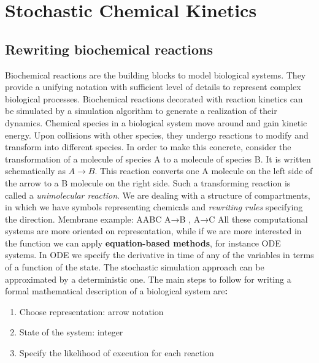 \graphicspath{{chapters/02/images/}}
\chapter{Stochastic Chemical Kinetics}

\section{Rewriting biochemical reactions}
Biochemical reactions are the building blocks to model biological systems.
They provide a unifying notation with sufficient level of details to represent complex biological processes.
Biochemical reactions decorated with reaction kinetics can be simulated by a simulation algorithm to generate a realization of their dynamics.
Chemical species in a biological system move around and gain kinetic energy.
Upon collisions with other species, they undergo reactions to modify and transform into different species.
In order to make this concrete, consider the transformation of a molecule of species A to a molecule of species B.
It is written schematically as $A \rightarrow B$.
This reaction converts one A molecule on the left side of the arrow to a B molecule on the right side.
Such a transforming reaction is called a \emph{unimolecular reaction}.
We are dealing with a structure of compartments, in which we have symbols representing chemicals and \emph{rewriting rules} specifying the direction.
Membrane example: AABC A→B , A→C All these computational systems are more oriented on representation, while if we are more interested in the function we can apply \textbf{equation-based methods}, for instance ODE systems.
In ODE we specify the derivative in time of any of the variables in terms of a function of the state.
The stochastic simulation approach can be approximated by a deterministic one.
The main steps to follow for writing a formal mathematical description of a biological system are\textbf{:}

\begin{enumerate}
  \def\labelenumi{\arabic{enumi}.}
  \item Choose representation: arrow notation
  \item State of the system: integer
  \item Specify the likelihood of execution for each reaction
\end{enumerate}

